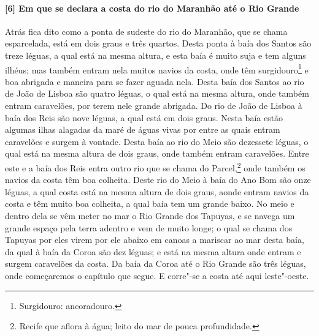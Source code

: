\begin{linenumbers}
\paragraph{[6] Em que se declara a costa do rio do Maranhão até o Rio Grande} \quad
Atrás fica dito como a ponta de sudeste do rio do Maranhão, que se chama esparcelada, está
em dois graus e três quartos. Desta ponta à baía dos Santos são treze léguas, a qual está
na mesma altura, e esta baía é muito suja e tem alguns ilhéus; mas também entram nela
muitos navios da costa, onde têm surgidouro\footnote{Surgidouro: ancoradouro.} e boa abrigada e maneira para se fazer aguada
nela. Desta baía dos Santos ao rio de João de Lisboa são quatro léguas, o qual está na
mesma altura, onde também entram caravelões, por terem nele grande abrigada. Do rio de
João de Lisboa à baía dos Reis são nove léguas, a qual está em dois graus. Nesta baía
estão algumas ilhas alagadas da maré de águas vivas por entre as quais entram caravelões e
surgem à vontade. Desta baía ao rio do Meio são dezessete léguas, o qual está na mesma
altura de dois graus, onde também entram caravelões. Entre este e a baía dos Reis entra
outro rio que se chama do Parcel,\footnote{ Recife que aflora à água; leito do mar de pouca
profundidade.} onde também os navios da costa têm boa colheita. Deste rio do Meio à baía
do Ano Bom são onze léguas, a qual costa está na mesma altura de dois graus, aonde entram
navios da costa e têm muito boa colheita, a qual baía tem um grande baixo. No meio e
dentro dela se vêm meter no mar o Rio Grande dos Tapuyas, e se navega um grande espaço
pela terra adentro e vem de muito longe; o qual se chama dos Tapuyas por eles virem por
ele abaixo em canoas a mariscar ao mar desta baía, da qual à baía da Coroa são dez léguas;
e está na mesma altura onde entram e surgem caravelões da costa. Da baía da Coroa até o
Rio Grande são três léguas, onde começaremos o capítulo que segue. E corre"-se a costa até
aqui leste"-oeste.


\end{linenumbers}
